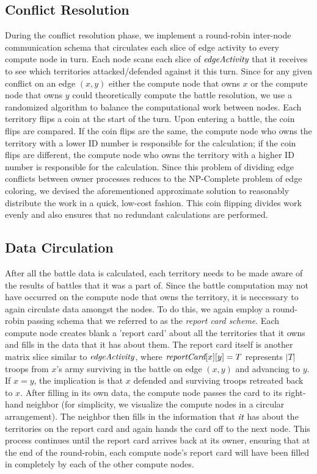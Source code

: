 \documentclass[10pt]{article}
\begin{document}
\begin{multicols}{2}
		\subsection*{Conflict Resolution}

		During the conflict resolution phase, we implement a round-robin inter-node communication schema that circulates each slice of edge activity to every compute node in turn. 
		Each node scans each slice of $\emph{edgeActivity}$ that it receives to see which territories attacked/defended against it this turn.
		Since for any given conflict on an edge $(x, y)$ either the compute node that owns $x$ or the compute node that owns $y$ could theoretically compute the battle resolution, we use a randomized algorithm to balance the computational work between nodes.
		Each territory flips a coin at the start of the turn.
		Upon entering a battle, the coin flips are compared.
		If the coin flips are the same, the compute node who owns the territory with a lower ID number is responsible for the calculation; if the coin flips are different, the compute node who owns the territory with a higher ID number is responsible for the calculation.
		Since this problem of dividing edge conflicts between owner processes reduces to the NP-Complete problem of edge coloring, we devised the aforementioned approximate solution to reasonably distribute the work in a quick, low-cost fashion. This coin flipping divides work evenly and also ensures that no redundant calculations are performed.

		\subsection*{Data Circulation}

		After all the battle data is calculated, each territory needs to be made aware of the results of battles that it was a part of. 
		Since the battle computation may not have occurred on the compute node that owns the territory, it is neccessary to again circulate data amongst the nodes. 
		To do this, we again employ a round-robin passing schema that we referred to as the \emph{report card scheme}. 
		Each compute node creates blank a 'report card' about all the territories that it owns and fills in the data that it has about them.
		The report card itself is another matrix slice similar to $\emph{edgeActivity}$, where $\emph{reportCard}[x][y] = T$ represents $|T|$ troops from $x$'s army surviving in the battle on edge $(x, y)$ and advancing to $y$. 
		If $x = y$, the implication is that $x$ defended and surviving troops retreated back to $x$. 
		After filling in its own data, the compute node passes the card to its right-hand neighbor (for simplicity, we visualize the compute nodes in a circular arrangement).
		The neighbor then fills in the information that $\emph{it}$ has about the territories on the report card and again hands the card off to the next node.
		This process continues until the report card arrives back at its owner, ensuring that at the end of the round-robin, each compute node's report card will have been filled in completely by each of the other compute nodes.


\end{multicols}
\end{document}
